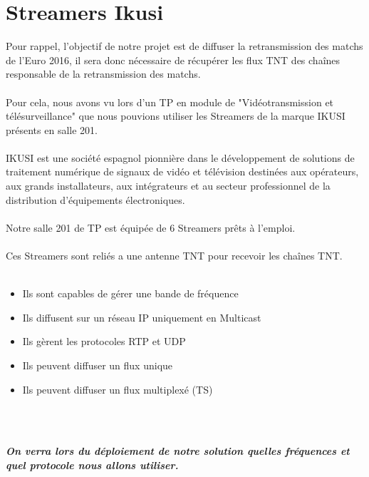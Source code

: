 \documentclass{report}
\begin{document}
    \section{Streamers Ikusi}
    Pour rappel, l’objectif de notre projet est de diffuser la retransmission des matchs de l’Euro 2016, il sera donc nécessaire de récupérer les flux TNT des chaînes responsable de la retransmission des matchs.
    \\
    \\
    Pour cela, nous avons vu lors d’un TP en module de "Vidéotransmission et télésurveillance" que nous pouvions utiliser les Streamers de la marque IKUSI présents en salle 201.
    \\
    \\
    IKUSI est une société espagnol pionnière dans le développement de solutions de traitement numérique de signaux de vidéo et télévision destinées aux opérateurs, aux grands installateurs, aux intégrateurs et au secteur professionnel de la distribution d'équipements électroniques.
    \\
    \\
    Notre salle 201 de TP est équipée de 6 Streamers prêts à l'emploi.
    \\
    \\
    

    Ces Streamers sont reliés a une antenne TNT pour recevoir les chaînes TNT.
    \\
    \\
        
    \begin{itemize}
    
    \item Ils sont capables de gérer une bande de fréquence
    \item Ils diffusent sur un réseau IP uniquement en Multicast
    \item Ils gèrent les protocoles RTP et UDP
    \item Ils peuvent diffuser un flux unique
    \item Ils peuvent diffuser un flux multiplexé (TS)
    \end{itemize}
    \\
    \hfill
    \\
    \begin{center}
    \textbf{\textit{On verra lors du déploiement de notre solution quelles fréquences et quel protocole nous allons utiliser.}}
    \end{center}
    
\end{document}
